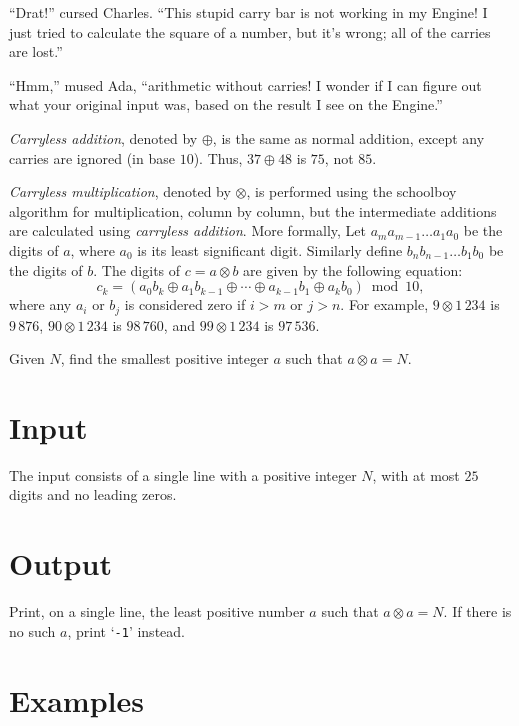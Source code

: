 

\noindent
``Drat!'' cursed Charles.  ``This stupid carry bar is not working
in my Engine!  I just tried to calculate the square of a number,
but it's wrong; all of the carries are lost.''

``Hmm,'' mused Ada, ``arithmetic without carries!  I wonder if
I can figure out what your original input was,
based on the result I see on the Engine.''

\emph{Carryless addition}, denoted by $\oplus$, is the same as normal addition, except any carries
are ignored (in base $10$). Thus, $37 \oplus 48$ is $75$, not $85$.

\emph{Carryless multiplication}, denoted by $\otimes$, is performed using the schoolboy algorithm
for multiplication, column by column, but the intermediate additions are
calculated using \emph{carryless addition}. More formally,
Let $a_m a_{m-1} \ldots a_1 a_0$ be the digits of $a$, where $a_0$ is its least significant digit.
Similarly define $b_n b_{n-1} \ldots b_1 b_0$ be the digits of $b$.
The digits of $c = a \otimes b$ are given by the following equation:
\[
c_k = \left( a_0 b_k \oplus a_1 b_{k-1} \oplus \cdots \oplus a_{k-1} b_1 \oplus a_k b_0 \right) \bmod{10},
\]
where any $a_i$ or $b_j$ is considered zero if $i > m$ or $j > n$. For example, $9 \otimes 1\,234$ is $9\,876$,
$90 \otimes 1\,234$ is $98\,760$, and $99 \otimes 1\,234$ is $97\,536$.


Given $N$, find the smallest positive integer $a$ such that $a \otimes a = N$.

\section*{Input}

The input consists of a single line with a positive integer $N$,
with at most $25$ digits and no leading zeros.

\section*{Output}

Print, on a single line, the least positive number $a$ such that $a \otimes a = N$.
If there is no such $a$, print `{\tt -1}' instead.

\section*{Examples}
